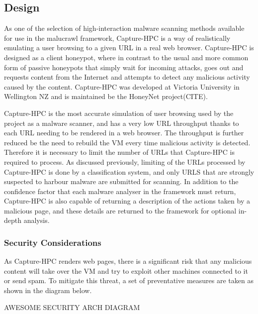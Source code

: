\subsection{Design}

As one of the selection of high-interaction malware scanning
methods available for use in the malucrawl framework,
Capture-HPC\cite{capture-hpc} is a way of
realistically emulating a user browsing to a given URL in a real web browser.
Capture-HPC is designed as a client honeypot, where in contrast to the usual and
more common form of passive honeypots that simply wait for incoming attacks,
goes out and requests content from the Internet and attempts to detect any
malicious activity caused by the content. Capture-HPC was developed at Victoria
University in Wellington NZ and is maintained be the HoneyNet project(CITE).


Capture-HPC is the most accurate simulation of user browsing used by the project
as a malware scanner, and has a very low URL throughput thanks to each URL
needing to be rendered in a web browser. The throughput is further reduced be
the need to rebuild the VM every time malicious activity is detected. Therefore
it is necessary to limit the number of URLs that Capture-HPC is required to
process. As discussed previously, limiting of the URLs processed by Capture-HPC
is done by a classification system, and only URLS that are strongly suspected to
harbour malware are submitted for scanning. In addition to the confidence factor
that each malware analyser in the framework must return, Capture-HPC is also
capable of returning a description of the actions taken by a malicious page, and
these details are returned to the framework for optional in-depth analysis.

\subsubsection{Security Considerations}

As Capture-HPC renders web pages, there is a significant risk that any malicious
content will take over the VM and try to exploit other machines connected to it
or send spam. To mitigate this threat, a set of preventative measures are taken
as shown in the diagram below.

AWESOME SECURITY ARCH DIAGRAM

